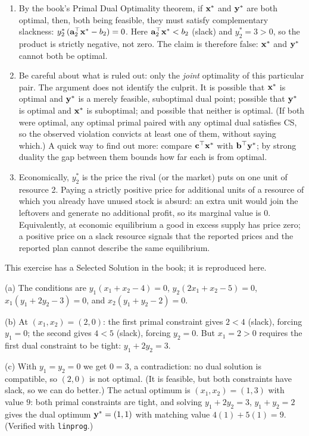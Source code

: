 \begin{enumerate}
\item By the book's Primal Dual Optimality theorem, if $\mathbf{x}^*$ and $\mathbf{y}^*$ are both optimal, then, both being feasible, they must satisfy complementary slackness: $y_2^*\,(\mathbf{a}_2^\top\mathbf{x}^* - b_2) = 0$. Here $\mathbf{a}_2^\top\mathbf{x}^* < b_2$ (slack) and $y_2^* = 3 > 0$, so the product is strictly negative, not zero. The claim is therefore false: $\mathbf{x}^*$ and $\mathbf{y}^*$ cannot both be optimal.
\item Be careful about what is ruled out: only the \emph{joint} optimality of this particular pair. The argument does not identify the culprit. It is possible that $\mathbf{x}^*$ is optimal and $\mathbf{y}^*$ is a merely feasible, suboptimal dual point; possible that $\mathbf{y}^*$ is optimal and $\mathbf{x}^*$ is suboptimal; and possible that neither is optimal. (If both were optimal, any optimal primal paired with any optimal dual satisfies CS, so the observed violation convicts at least one of them, without saying which.) A quick way to find out more: compare $\mathbf{c}^\top\mathbf{x}^*$ with $\mathbf{b}^\top\mathbf{y}^*$; by strong duality the gap between them bounds how far each is from optimal.
\item Economically, $y_2^*$ is the price the rival (or the market) puts on one unit of resource 2. Paying a strictly positive price for additional units of a resource of which you already have unused stock is absurd: an extra unit would join the leftovers and generate no additional profit, so its marginal value is $0$. Equivalently, at economic equilibrium a good in excess supply has price zero; a positive price on a slack resource signals that the reported prices and the reported plan cannot describe the same equilibrium.
\end{enumerate}


This exercise has a Selected Solution in the book; it is reproduced here.

(a) The conditions are $y_1(x_1 + x_2 - 4) = 0$, $y_2(2x_1 + x_2 - 5) = 0$, $x_1(y_1 + 2y_2 - 3) = 0$, and $x_2(y_1 + y_2 - 2) = 0$.

(b) At $(x_1, x_2) = (2, 0)$: the first primal constraint gives $2 < 4$ (slack), forcing $y_1 = 0$; the second gives $4 < 5$ (slack), forcing $y_2 = 0$. But $x_1 = 2 > 0$ requires the first dual constraint to be tight: $y_1 + 2y_2 = 3$.

(c) With $y_1 = y_2 = 0$ we get $0 = 3$, a contradiction: no dual solution is compatible, so $(2,0)$ is not optimal. (It is feasible, but both constraints have slack, so we can do better.) The actual optimum is $(x_1, x_2) = (1, 3)$ with value $9$: both primal constraints are tight, and solving $y_1 + 2y_2 = 3$, $y_1 + y_2 = 2$ gives the dual optimum $\mathbf{y}^* = (1,1)$ with matching value $4(1) + 5(1) = 9$. (Verified with \texttt{linprog}.)

